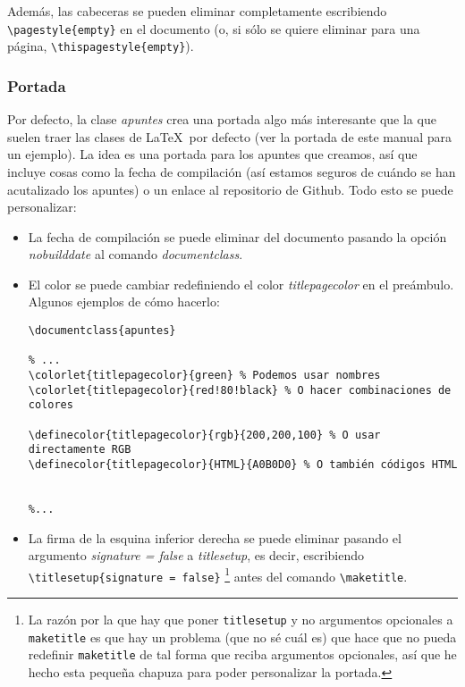Además, las cabeceras se pueden eliminar completamente escribiendo \verb|\pagestyle{empty}| en el documento (o, si sólo se quiere eliminar para una página, \verb|\thispagestyle{empty}|).

\subsubsection{Portada}

Por defecto, la clase \textit{apuntes} crea una portada algo más interesante que la que suelen traer las clases de \LaTeX\ por defecto (ver la portada de este manual para un ejemplo). La idea es una portada para los apuntes que creamos, así que incluye cosas como la fecha de compilación (así estamos seguros de cuándo se han acutalizado los apuntes) o un enlace al repositorio de Github. Todo esto se puede personalizar:

\begin{itemize}
\item La fecha de compilación se puede eliminar del documento pasando la opción \textit{nobuilddate} al comando \textit{documentclass}.
\item El color se puede cambiar redefiniendo el color \textit{titlepagecolor} en el preámbulo. Algunos ejemplos de cómo hacerlo:

\begin{verbatim}
\documentclass{apuntes}

% ...
\colorlet{titlepagecolor}{green} % Podemos usar nombres
\colorlet{titlepagecolor}{red!80!black} % O hacer combinaciones de colores

\definecolor{titlepagecolor}{rgb}{200,200,100} % O usar directamente RGB
\definecolor{titlepagecolor}{HTML}{A0B0D0} % O también códigos HTML


%...
\end{verbatim}

\item {} La firma de la esquina inferior derecha se puede eliminar pasando el argumento \textit{signature = false} a \textit{titlesetup}, es decir, escribiendo \verb|\titlesetup{signature = false}|
	\footnote{La razón por la que hay que poner \texttt{titlesetup} y no argumentos opcionales a \texttt{maketitle} es que hay un problema (que no sé cuál es) que hace que no pueda redefinir \texttt{maketitle} de tal forma que reciba argumentos opcionales, así que he hecho esta pequeña chapuza para poder personalizar la portada.}
	antes del comando \verb|\maketitle|.
\end{itemize}



